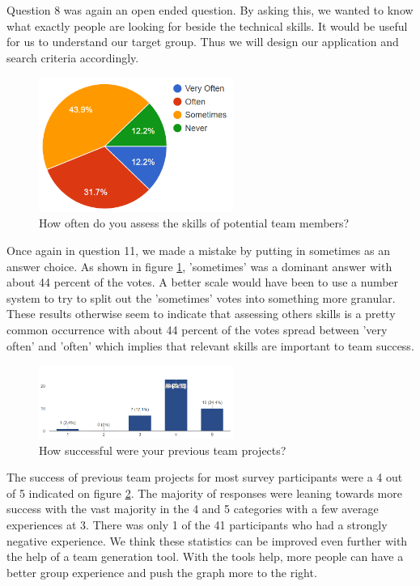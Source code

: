 \documentclass[conference]{IEEEtran}
\begin{document}
Question 8 was again an open ended question. By asking this, we wanted to know what exactly people are looking for beside the technical skills. It would be useful for us to understand our target group. Thus we will design our application and search criteria accordingly.  

\begin{figure}[!ht]
\centering
\includegraphics[width=2.5in]{assess_skill}
\caption{How often do you assess the skills of potential team members?}
\label{assess_skill}
\end{figure}

Once again in question 11, we made a mistake by putting in sometimes as an answer choice. As shown in figure
\ref{assess_skill}, 'sometimes' was a dominant answer with about 44 percent of the votes. A better scale would
have been to use a number system to try to split out the 'sometimes' votes into something more granular. These results
otherwise seem to indicate that assessing others skills is a pretty common occurrence with about 44 percent of the votes
spread between 'very often' and 'often' which implies that relevant skills are important to team success. 

\begin{figure}[!ht]
\centering
\includegraphics[width=2.5in]{prev_project_success}
\caption{How successful were your previous team projects?}
\label{prev_project_success}
\end{figure}

The success of previous team projects for most survey participants were a 4 out of 5 indicated on figure
\ref{prev_project_success}. The majority of responses were leaning towards more success with the vast majority in the 
4 and 5 categories with a few average experiences at 3. There was only 1 of the 41 participants who had a strongly 
negative experience. We think these statistics can be improved even further with the help of a team generation tool. 
With the tools help, more people can have a better group experience and push the graph more to the right. 
 
\end{document}
